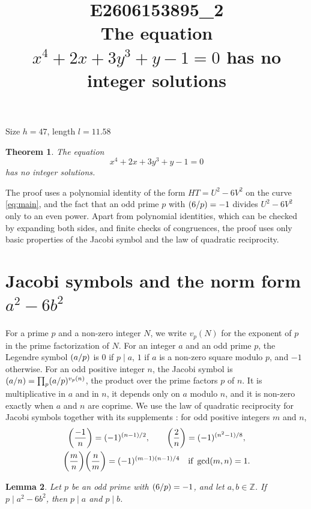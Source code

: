 \documentclass[11pt]{article}
\title{\textbf{E2606153895\_2}\\[4pt] {\Large The equation $x^{4}+2x+3y^{3}+y-1=0$ has no integer solutions}}
\author{}
\date{}
\newtheorem{theorem}{Theorem}
\newtheorem{lemma}[theorem]{Lemma}
\newcommand{\Z}{\mathbb{Z}}
\newcommand{\leg}[2]{\mathchoice{\biggl(\dfrac{#1}{#2}\biggr)}{(#1/#2)}{(#1/#2)}{(#1/#2)}}
\begin{document}
\maketitle
\vspace{-8ex}
\begin{center}
Size $h=47$, length $l=11.58$
\end{center}

\begin{theorem}\label{thm:main}
The equation
\begin{equation}\label{eq:main}
x^{4}+2x+3y^{3}+y-1=0
\end{equation}
has no integer solutions.
\end{theorem}

The proof uses a polynomial identity of the form $HT=U^2-6V^2$ on the curve \eqref{eq:main}, and the fact that an odd prime $p$ with $\leg{6}{p}=-1$ divides $U^2-6V^2$ only to an even power. Apart from polynomial identities, which can be checked by expanding both sides, and finite checks of congruences, the proof uses only basic properties of the Jacobi symbol and the law of quadratic reciprocity.

\section{\texorpdfstring{Jacobi symbols and the norm form $a^2-6b^2$}{Jacobi symbols and the norm form}}

For a prime $p$ and a non-zero integer $N$, we write $v_p(N)$ for the exponent of $p$ in the prime factorization of $N$. For an integer $a$ and an odd prime $p$, the Legendre symbol $\leg{a}{p}$ is $0$ if $p\mid a$, $1$ if $a$ is a non-zero square modulo $p$, and $-1$ otherwise. For an odd positive integer $n$, the Jacobi symbol is $\leg{a}{n}=\prod_p\leg{a}{p}^{v_p(n)}$, the product over the prime factors $p$ of $n$. It is multiplicative in $a$ and in $n$, it depends only on $a$ modulo $n$, and it is non-zero exactly when $a$ and $n$ are coprime. We use the law of quadratic reciprocity for Jacobi symbols together with its supplements \cite[Chapter~5, \S2]{IR}: for odd positive integers $m$ and $n$,
\begin{gather*}
\leg{-1}{n}=(-1)^{(n-1)/2},\qquad\leg{2}{n}=(-1)^{(n^2-1)/8},\\
\leg{m}{n}\leg{n}{m}=(-1)^{(m-1)(n-1)/4}\quad\text{if }\gcd(m,n)=1.
\end{gather*}

\begin{lemma}\label{lem:divides}
Let $p$ be an odd prime with $\leg{6}{p}=-1$, and let $a,b\in\Z$. If $p\mid a^2-6b^2$, then $p\mid a$ and $p\mid b$.
\end{lemma}
\end{document}
